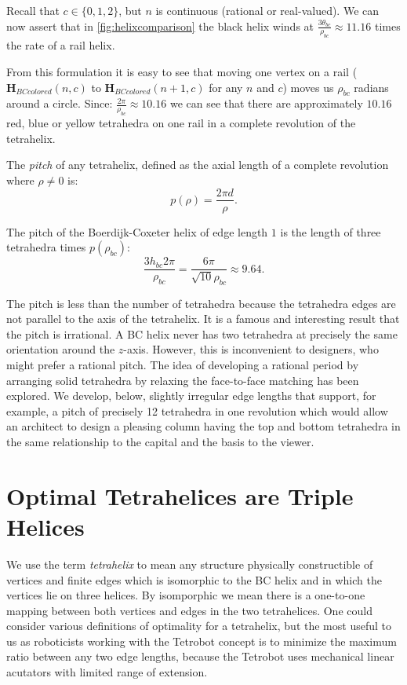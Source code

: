 \documentclass[twocolumn,10pt]{asme2ej}
\renewcommand{\vec}[1]{\mathbf{#1}}
\begin{document}
Recall that $c \in \{0,1,2\}$, but $n$ is continuous (rational or real-valued).
We can now assert that in \cref{fig:helixcomparison} the black helix winds at
$\frac{3 \theta_{bc}}{\rho_{bc}} \approx 11.16 $ times the rate of a rail helix.

From this formulation it is easy to see that moving one vertex on a rail
($\vec{H}_{BCcolored}(n,c)$ to $\vec{H}_{BCcolored}(n+1,c)$ for any $n$ and $c$)
moves us $\rho_{bc}$ radians around a circle. Since:
$ \frac{2 \pi}{\rho_{bc}} \approx 10.16 $
we can see that there are approximately $10.16$ red, blue or yellow tetrahedra on one rail in a
complete revolution of the tetrahelix.

The \emph{pitch} of any tetrahelix, defined as the axial length of a complete revolution
where $\rho \neq 0$ is:
\begin{equation}
  \label{pitcheqn}
p(\rho) = \frac{2 \pi  d}{\rho} \text{.}
\end{equation}

The pitch of the Boerdijk-Coxeter helix of edge length $1$ is the length of three tetrahedra times
$p(\rho_{bc})$:
\begin{equation}
   \frac{3 h_{bc}  2 \pi }{\rho_{bc}} 
   = \frac{6 \pi}{\sqrt{10}\rho_{bc}}
   \approx 9.64
 \text{.}
\end{equation}


The pitch is less than the number of tetrahedra because the tetrahedra
edges are not parallel to the axis of the tetrahelix.  It is a famous and interesting result
that the pitch is irrational. A BC helix never has two tetrahedra at
precisely the same orientation around the $z$-axis. However, this is
inconvenient to designers, who might prefer a rational pitch.
The idea of developing a rational period by arranging solid tetrahedra by relaxing the face-to-face matching
has been explored\cite{sadler2013periodic}. 
We develop, below, slightly irregular edge lengths that support, for example, a pitch of precisely 12
tetrahedra in one revolution which would allow an architect to
design a pleasing column having the top and bottom tetrahedra in the same relationship to the capital and the basis to the
viewer.

\section{Optimal Tetrahelices are Triple Helices}

We use the term \emph{tetrahelix} to mean any structure physically constructible of
vertices and finite edges which is isomorphic to the BC helix and in which the
vertices lie on three helices.
By isomporphic we mean there is a one-to-one mapping between both
vertices and edges in the two tetrahelices.
One could consider various definitions of optimality for a
tetrahelix, but the most useful to us as roboticists working with the Tetrobot
concept is to minimize the
maximum ratio between any two edge lengths, because the Tetrobot uses
mechanical linear acutators with
limited range of extension.
\end{document}
